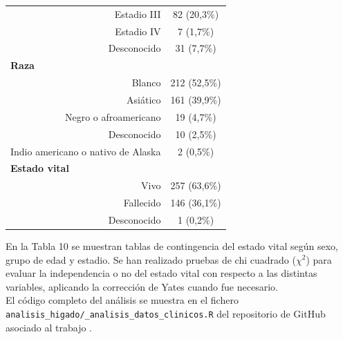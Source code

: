 \begin{table}[H]
\begin{tabular}{rc}
		Estadio III                                    & 82 (20,3\%)                                      \\
		Estadio IV                                     & 7 (1,7\%)                                        \\
		Desconocido                                    & 31 (7,7\%)                                       \\ \hline
		\multicolumn{1}{l}{\textbf{Raza}}              &                                                  \\
		Blanco                                         & 212 (52,5\%)                                     \\
		Asiático                                       & 161 (39,9\%)                                     \\
		Negro o afroamericano                          & 19 (4,7\%)                                       \\
		Desconocido                                    & 10 (2,5\%)                                       \\
		Indio americano o nativo de Alaska             & 2 (0,5\%)                                        \\ \hline
		\multicolumn{1}{l}{\textbf{Estado vital}}      &                                                  \\ 
		Vivo                                           & 257 (63,6\%)                                     \\
		Fallecido                                         & 146 (36,1\%)                                     \\
		Desconocido                                    & 1 (0,2\%)                                        \\ \hline
	\end{tabular}
\end{table}

En la Tabla 10 se muestran tablas de contingencia del estado vital según sexo, grupo de edad y estadio. Se han realizado pruebas de chi cuadrado ($\chi^2$) \cite{Pearson1900} para evaluar la independencia o no del estado vital con respecto a las distintas variables, aplicando la corrección de Yates \cite{Yates1934} cuando fue necesario.\\

El código completo del análisis se muestra en el fichero \texttt{analisis\_higado/\_analisis\_datos\_clinicos.R} del repositorio de GitHub asociado al trabajo \cite{Redondo-Sanchez2020}.\\

